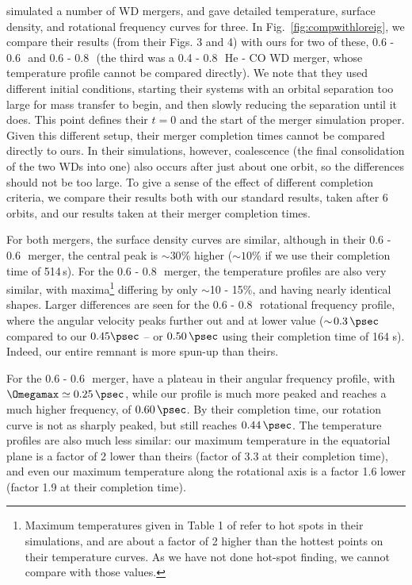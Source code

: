 \citeal{loreig09} simulated a number of WD mergers, and gave detailed temperature, surface density, and rotational frequency curves for three.   In Fig.~\ref{fig:compwithloreig}, we compare their results (from their Figs. 3 and 4) with ours for two of these, 0.6 - 0.6\,\Msun\ and 0.6 - 0.8\,\Msun\ (the third was a 0.4 - 0.8\,\Msun\ He - CO WD merger, whose temperature profile cannot be compared directly).  We note that they used different initial conditions, starting their systems with an orbital separation too large for mass transfer to begin, and then slowly reducing the separation until it does.  This point defines their $t = 0$ and the start of the merger simulation proper.  Given this different setup, their merger completion times cannot be compared directly to ours.  In their simulations, however, coalescence (the final consolidation of the two WDs into one) also occurs after just about one orbit, so the differences should not be too large.  To give a sense of the effect of different completion criteria, we compare their results both with our standard results, taken after 6 orbits, and our results taken at their merger completion times.

For both mergers, the surface density curves are similar, although in their 0.6 - 0.6\,\Msun\ merger, the central peak is $\sim\!30$\% higher ($\sim\!10$\% if we use their completion time of 514\,s).  For the 0.6 - 0.8\,\Msun\ merger, the temperature profiles are also very similar, with maxima\footnote{Maximum temperatures given in Table 1 of \citeal{loreig09} refer to hot spots in their simulations, and are about a factor of 2 higher than the hottest points on their temperature curves.  As we have not done hot-spot finding, we cannot compare with those values.} differing by only $\sim$10 - 15\%, and having nearly identical shapes.  Larger differences are seen for the 0.6 - 0.8\,\Msun\ rotational frequency profile, where the angular velocity peaks further out and at lower value ($\sim\!0.3\,\psec$ compared to our $0.45\psec$ -- or $0.50\,\psec$ using their completion time of 164 s).  Indeed, our entire remnant is more spun-up than theirs.  

For the 0.6 - 0.6\,\Msun\ merger, \citeal{loreig09} have a plateau in their angular frequency profile, with $\Omegamax\simeq0.25\,\psec$, while our profile is much more peaked and reaches a much higher frequency, of $0.60\,\psec$.  By their completion time, our rotation curve is not as sharply peaked, but still reaches $0.44\,\psec$.  The temperature profiles are also much less similar: our maximum temperature in the equatorial plane is a factor of 2 lower than theirs (factor of 3.3 at their completion time), and even our maximum temperature along the rotational axis is a factor 1.6 lower (factor 1.9 at their completion time).  

